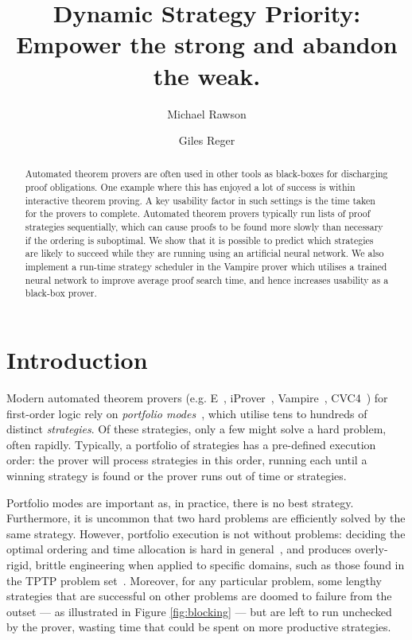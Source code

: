 \documentclass{llncs}
\title{Dynamic Strategy Priority: \\ Empower the strong and abandon the weak.}
\author{
 Michael Rawson \and 
 Giles Reger
}
\institute{
University of Manchester, Manchester, UK
}
\newcommand{\vampire}{{Vampire}}
\newcommand{\iprover}{iProver}
\newcommand{\E}{{\textsc E}}
\begin{document}
\maketitle
\begin{abstract}
Automated theorem provers are often used in other tools as black-boxes for discharging proof obligations. One example where this has enjoyed a lot of success is within interactive theorem proving. 
%
A key usability factor in such settings is the time taken for the provers to complete.
Automated theorem provers typically run lists of proof strategies sequentially, which can cause proofs to be found more slowly than necessary if the ordering is suboptimal.
We show that it is possible to predict which strategies are likely to succeed while they are running using an artificial neural network.
We also implement a run-time strategy scheduler in the \vampire{} prover which utilises a trained neural network to improve average proof search time, and hence increases usability as a black-box prover.
\end{abstract}

\section{Introduction}
\label{sec:intro}
%
Modern automated theorem provers (e.g. \E{}~\cite{E}, \iprover{}~\cite{iProver}, \vampire{}~\cite{Vampire}, CVC4~\cite{CVC4}) for first-order logic rely on \emph{portfolio modes}~\cite{portfolio}, which utilise tens to hundreds of distinct \emph{strategies}.
Of these strategies, only a few might solve a hard problem, often rapidly.
Typically, a portfolio of strategies has a pre-defined execution order: the prover will process strategies in this order, running each until a winning strategy is found or the prover runs out of time or strategies.

Portfolio modes are important as, in practice, there is no best strategy.
Furthermore, it is uncommon that two hard problems are efficiently solved by the same strategy.
However, portfolio execution is not without problems: deciding the optimal ordering and time allocation is hard in general~\cite{predict-success}, and produces overly-rigid, brittle engineering when applied to specific domains, such as those found in the TPTP problem set~\cite{TPTP}.
Moreover, for any particular problem, some lengthy strategies that are successful on other problems are doomed to failure from the outset --- as illustrated in Figure \ref{fig:blocking} --- but are left to run unchecked by the prover, wasting time that could be spent on more productive strategies.
\end{document}
